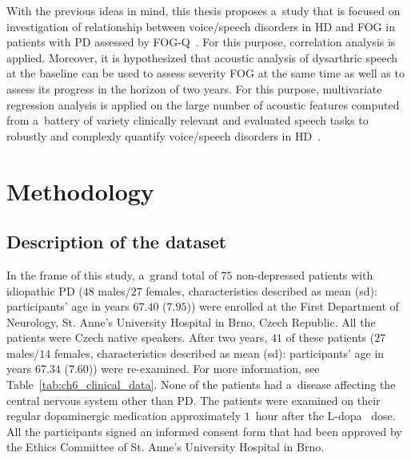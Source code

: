With the previous ideas in mind, this thesis proposes a~study that is focused on investigation of relationship between voice/speech disorders in HD and FOG in patients with PD assessed by FOG-Q~\cite{Giladi2000}. For this purpose, correlation analysis is applied. Moreover, it is hypothesized that acoustic analysis of dysarthric speech at the baseline can be used to assess severity FOG at the same time as well as to assess its progress in the horizon of two years. For this purpose, multivariate regression analysis is applied on the large number of acoustic features computed from a~battery of variety clinically relevant and evaluated speech tasks to robustly and complexly quantify voice/speech disorders in HD~\cite{Brabenec2017}.

\section{Methodology}
\label{ch6_3}

\subsection{Description of the dataset}
\label{ch6_3_1}

In the frame of this study, a~grand total of $75$ non-depressed patients with idiopathic PD ($48$ males/$27$ females, characteristics described as mean (sd): participants' age in years $67.40$ ($7.95$)) were enrolled at the First Department of Neurology, St. Anne's University Hospital in Brno, Czech Republic. All the patients were Czech native speakers. After two years, $41$ of these patients ($27$ males/$14$ females, characteristics described as mean (sd): participants' age in years $67.34$ ($7.60$)) were re-examined. For more information, see Table~\ref{tab:ch6_clinical_data}. None of the patients had a~disease affecting the central nervous system other than PD. The patients were examined on their regular dopaminergic medication approximately $1$~hour after the L-dopa~\cite{Lee2010} dose. All the participants signed an informed consent form that had been approved by the Ethics Committee of St. Anne's University Hospital in Brno.

